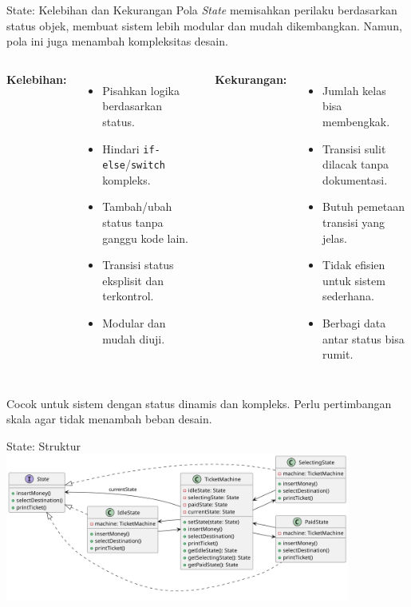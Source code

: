 \documentclass[aspectratio=169, table]{beamer}
\begin{document}
\begin{frame}{State: Kelebihan dan Kekurangan}
\vspace{10pt}
Pola \textit{State} memisahkan perilaku berdasarkan status objek, membuat sistem lebih modular dan mudah dikembangkan. Namun, pola ini juga menambah kompleksitas desain.

\vspace{6pt}
\begin{columns}[T]
\textbf{Kelebihan:}
\begin{itemize}
	\item Pisahkan logika berdasarkan status.
	\item Hindari \texttt{if-else}/\texttt{switch} kompleks.
	\item Tambah/ubah status tanpa ganggu kode lain.
	\item Transisi status eksplisit dan terkontrol.
	\item Modular dan mudah diuji.
\end{itemize}

\textbf{Kekurangan:}
\begin{itemize}
	\item Jumlah kelas bisa membengkak.
	\item Transisi sulit dilacak tanpa dokumentasi.
	\item Butuh pemetaan transisi yang jelas.
	\item Tidak efisien untuk sistem sederhana.
	\item Berbagi data antar status bisa rumit.
\end{itemize}
\end{columns}

\vspace{4pt}
\small Cocok untuk sistem dengan status dinamis dan kompleks. Perlu pertimbangan skala agar tidak menambah beban desain.
\end{frame}

\begin{frame}{State: Struktur}
\centering
\includegraphics[width=0.85\textwidth]{../../figures/out/state.png}
\end{frame}
\end{document}
